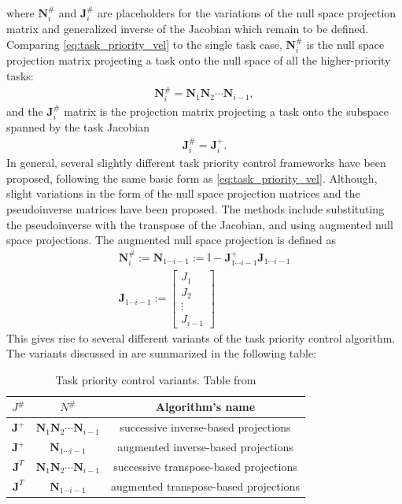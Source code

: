 where \(\bm{N}_i^{\#}\) and \(\bm{J}_i^{\#}\) are placeholders for the
variations of the null space projection matrix and generalized inverse of the Jacobian
which remain to be defined.
Comparing \autoref{eq:task_priority_vel} to the single task case, $\bm{N}_i^{\#}$ is the null space projection matrix
projecting a task onto the null space of all the higher-priority tasks:
\begin{align}
    \bm{N}_i^{\#} = \bm{N}_1 \bm{N}_2 \cdots \bm{N}_{i-1},
\end{align}
and the $\bm{J}_i^{\#}$ matrix is the projection matrix projecting a task onto the
subspace spanned by the task Jacobian
\begin{align}
    \bm{J}_i^{\#} = \bm{J}_i^+.
\end{align}
In general, several slightly different task priority control frameworks have
been proposed, following the same basic form as \autoref{eq:task_priority_vel}.
Although, slight variations in the form of the null space projection matrices
and the pseudoinverse matrices have been proposed. The methods include substituting
the pseudoinverse with the transpose of the Jacobian, and using augmented null space
projections.
The augmented null space projection is defined as
\begin{subequations}
    \label{eq:augmented_null_space}
\begin{align}
    \bm{N}_i^{\#} := \bm{N}_{1\cdots i-1} := \mathbb{I} - \bm{J}_{1\cdots i-1}^+ \bm{J}_{1\cdots i-1} \\
    \bm{J}_{1\cdots i-1} := \begin{bmatrix}
        J_1 \\
        J_2 \\
        \vdots \\
        J_{i-1}
    \end{bmatrix}
\end{align}
\end{subequations}
This gives rise to several different variants of the task priority control algorithm.
The variants discussed in \cite{antonelli2009} are summarized in the following table:
\begin{table}[h]
    \centering
    \begin{tabular}{|c|c|c|}
        \hline
        $J^{\#}$ & $N^{\#}$ & Algorithm's name \\
        \hline
        $\bm{J}^+$ & $\bm{N}_1 \bm{N}_2 \cdots \bm{N}_{i-1}$ & successive inverse-based projections \\
        $\bm{J}^+$ & $\bm{N}_{1\cdots i-1}$ & augmented inverse-based projections \\
        $\bm{J}^T$ & $\bm{N}_1 \bm{N}_2 \cdots \bm{N}_{i-1}$ & successive transpose-based projections \\
        $\bm{J}^T$ & $\bm{N}_{1\cdots i-1}$ & augmented transpose-based projections \\
        \hline
    \end{tabular}
    \label{tab:tpc_variants}
    \caption{Task priority control variants. Table from \cite{antonelli2009}}
\end{table}


